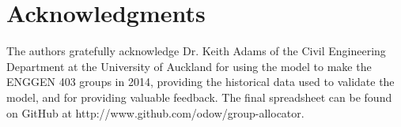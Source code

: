 \documentclass[12pt]{ORSNZ}
\begin{document}
\section*{Acknowledgments}
The authors gratefully acknowledge Dr. Keith Adams of the Civil Engineering Department at the University of Auckland for using the model to make the ENGGEN 403 groups in 2014, providing the historical data used to validate the model, and for providing valuable feedback. The final spreadsheet can be found on GitHub at http://www.github.com/odow/group-allocator.


\end{document}
